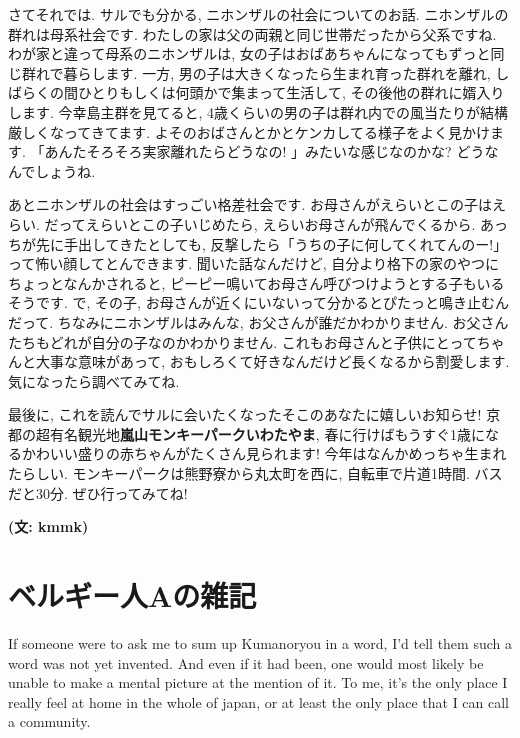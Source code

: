 \documentclass[10pt,b5jsbook,dvips,dvipdfmx,openany]{jsbook}
\theoremstyle{definition}
\begin{document}
		さてそれでは. サルでも分かる, ニホンザルの社会についてのお話. ニホンザルの群れは母系社会です. わたしの家は父の両親と同じ世帯だったから父系ですね. わが家と違って母系のニホンザルは, 女の子はおばあちゃんになってもずっと同じ群れで暮らします. 一方, 男の子は大きくなったら生まれ育った群れを離れ, しばらくの間ひとりもしくは何頭かで集まって生活して, その後他の群れに婿入りします. 今幸島主群を見てると, 4歳くらいの男の子は群れ内での風当たりが結構厳しくなってきてます. よそのおばさんとかとケンカしてる様子をよく見かけます. 「あんたそろそろ実家離れたらどうなの! 」みたいな感じなのかな? どうなんでしょうね.

		あとニホンザルの社会はすっごい格差社会です. お母さんがえらいとこの子はえらい. だってえらいとこの子いじめたら, えらいお母さんが飛んでくるから. あっちが先に手出してきたとしても, 反撃したら「うちの子に何してくれてんのー!」って怖い顔してとんできます. 聞いた話なんだけど, 自分より格下の家のやつにちょっとなんかされると, ピーピー鳴いてお母さん呼びつけようとする子もいるそうです. で, その子, お母さんが近くにいないって分かるとぴたっと鳴き止むんだって. ちなみにニホンザルはみんな, お父さんが誰だかわかりません. お父さんたちもどれが自分の子なのかわかりません. これもお母さんと子供にとってちゃんと大事な意味があって, おもしろくて好きなんだけど長くなるから割愛します. 気になったら調べてみてね.

		最後に, これを読んでサルに会いたくなったそこのあなたに嬉しいお知らせ! 京都の超有名観光地\textbf{嵐山モンキーパークいわたやま}, 春に行けばもうすぐ1歳になるかわいい盛りの赤ちゃんがたくさん見られます! 今年はなんかめっちゃ生まれたらしい. モンキーパークは熊野寮から丸太町を西に, 自転車で片道1時間. バスだと30分. ぜひ行ってみてね!

{\bf (文: kmmk)}

		\section{ベルギー人Aの雑記} %
		If someone were to ask me to sum up Kumanoryou in a word, I'd tell them such a word was not yet invented. And even if it had been, one would most likely be unable to make a mental picture at the mention of it. To me, it's the only place I really feel at home in the whole of japan, or at least the only place that I can call a community.
\end{document}
